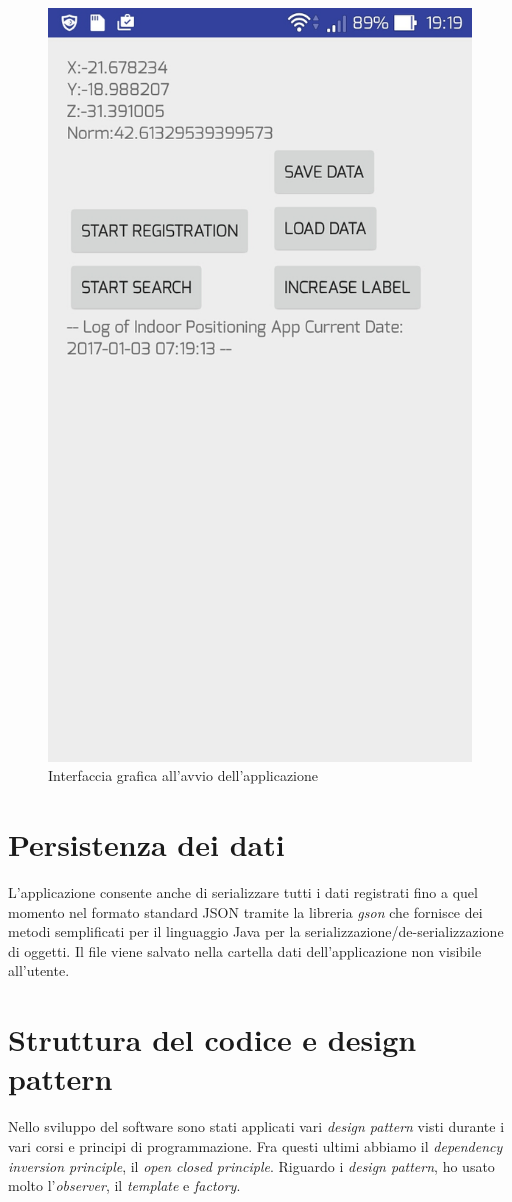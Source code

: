\begin{figure}[H]
\centering
\includegraphics[width=0.3\linewidth]{img/app_screen}
\caption{Interfaccia grafica all'avvio dell'applicazione}
\label{fig:app_screen}
\end{figure}

\section*{Persistenza dei dati}
L'applicazione consente anche di serializzare tutti i dati registrati fino a quel momento nel formato standard JSON tramite la libreria \textit{gson} che fornisce dei metodi semplificati per il linguaggio Java per la serializzazione/de-serializzazione di oggetti. Il file viene salvato nella cartella dati dell'applicazione non visibile all'utente.

\section*{Struttura del codice e design pattern}
Nello sviluppo del software sono stati applicati vari \textit{design pattern} visti durante i vari corsi e principi di programmazione. Fra questi ultimi abbiamo il \textit{dependency inversion principle}, il \textit{open closed principle}. Riguardo i \textit{design pattern}, ho usato molto l'\textit{observer}, il \textit{template} e \textit{factory}.